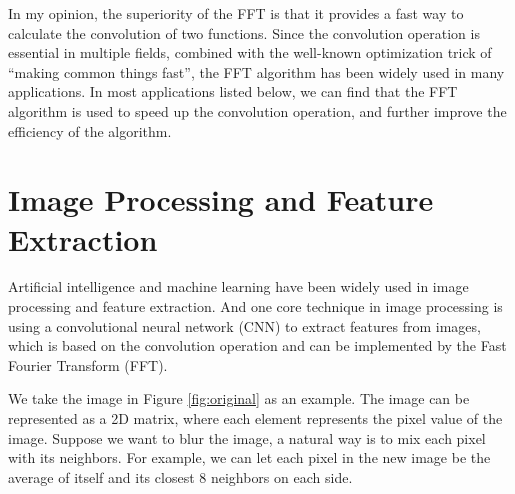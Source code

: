 \documentclass[a4paper,12pt]{article}
\begin{document}
In my opinion, the superiority of the FFT is that it provides a fast way to calculate the convolution of two functions.
Since the convolution operation is essential in multiple fields, combined with the well-known optimization trick of ``making common things fast'', the FFT algorithm has been widely used in many applications.
In most applications listed below, we can find that the FFT algorithm is used to speed up the convolution operation, and further improve the efficiency of the algorithm.

\section{Image Processing and Feature Extraction}

Artificial intelligence and machine learning have been widely used in image processing and feature extraction. 
And one core technique in image processing is using a convolutional neural network (CNN) to extract features from images, which is based on the convolution operation and can be implemented by the Fast Fourier Transform (FFT).

We take the image in Figure \ref{fig:original} as an example.
The image can be represented as a 2D matrix, where each element represents the pixel value of the image.
Suppose we want to blur the image, a natural way is to mix each pixel with its neighbors.
For example, we can let each pixel in the new image be the average of itself and its closest 8 neighbors on each side.
\end{document}
